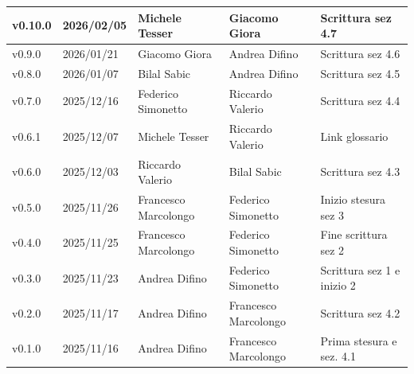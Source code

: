 \documentclass[a4paper,12pt]{article}
\begin{document}
\begin{center}
\begin{tabularx}{\textwidth}{|l|l|l|X|X|}
            \hline
            v0.10.0 & 2026/02/05 & Michele Tesser & Giacomo Giora & Scrittura sez 4.7 \\
            \hline
            v0.9.0 & 2026/01/21 & Giacomo Giora & Andrea Difino & Scrittura sez 4.6 \\
            \hline
            v0.8.0 & 2026/01/07 & Bilal Sabic & Andrea Difino & Scrittura sez 4.5 \\
            \hline
            v0.7.0 & 2025/12/16 & Federico Simonetto & Riccardo Valerio & Scrittura sez 4.4 \\
            \hline
            v0.6.1 & 2025/12/07 & Michele Tesser & Riccardo Valerio & Link glossario\\
            \hline
            v0.6.0 & 2025/12/03 & Riccardo Valerio & Bilal Sabic & Scrittura sez 4.3\\
            \hline
            v0.5.0 & 2025/11/26 & Francesco Marcolongo & Federico Simonetto & Inizio stesura sez 3\\
            \hline
            v0.4.0 & 2025/11/25 & Francesco Marcolongo & Federico Simonetto & Fine scrittura sez 2\\
            \hline
            v0.3.0 & 2025/11/23 & Andrea Difino & Federico Simonetto & Scrittura sez 1 e inizio 2\\
            \hline
            v0.2.0 & 2025/11/17 & Andrea Difino & Francesco Marcolongo & Scrittura sez 4.2\\
            \hline
            v0.1.0 & 2025/11/16 & Andrea Difino & Francesco Marcolongo & Prima stesura e sez. 4.1\\
            \hline
        \end{tabularx}
    \end{center}


\newpage

\tableofcontents

\newpage

\listoffigures

\newpage

\listoftables

\newpage
\end{document}
